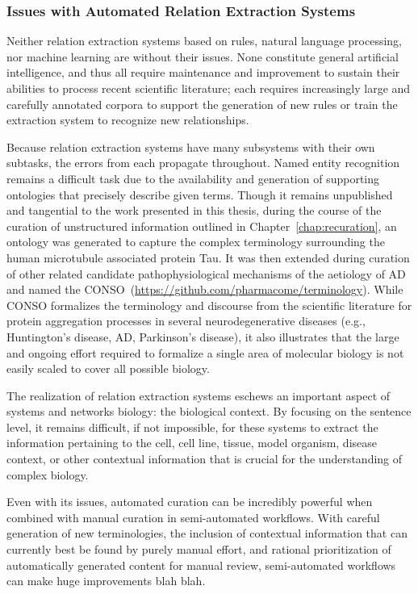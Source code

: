 \subsubsection{Issues with Automated Relation Extraction Systems}

Neither relation extraction systems based on rules, natural language processing, nor machine learning are without their issues.
None constitute general artificial intelligence, and thus all require maintenance and improvement to sustain their abilities to process recent scientific literature; each requires increasingly large and carefully annotated corpora to support the generation of new rules or train the extraction system to recognize new relationships.

Because relation extraction systems have many subsystems with their own subtasks, the errors from each propagate throughout.
Named entity recognition remains a difficult task due to the availability and generation of supporting ontologies that precisely describe given terms.
Though it remains unpublished and tangential to the work presented in this thesis, during the course of the curation of unstructured information outlined in Chapter~\autoref{chap:recuration}, an ontology was generated to capture the complex terminology surrounding the human microtubule associated protein Tau.
It was then extended during curation of other related candidate pathophysiological mechanisms of the aetiology of \ac{AD} and named the \ac{CONSO}~(\url{https://github.com/pharmacome/terminology}).
While \ac{CONSO} formalizes the terminology and discourse from the scientific literature for protein aggregation processes in several neurodegenerative diseases (e.g., Huntington's disease, \ac{AD}, Parkinson's disease), it also illustrates that the large and ongoing effort required to formalize a single area of molecular biology is not easily scaled to cover all possible biology.

The realization of relation extraction systems eschews an important aspect of systems and networks biology: the biological context.
By focusing on the sentence level, it remains difficult, if not impossible, for these systems to extract the information pertaining to the cell, cell line, tissue, model organism, disease context, or other contextual information that is crucial for the understanding of complex biology.

Even with its issues, automated curation can be incredibly powerful when combined with manual curation in semi-automated workflows.
With careful generation of new terminologies, the inclusion of contextual information that can currently best be found by purely manual effort, and rational prioritization of automatically generated content for manual review, semi-automated workflows can make huge improvements blah blah. %

